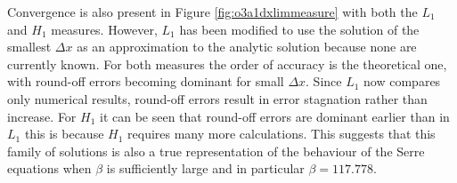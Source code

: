 \documentclass[SingleSpace,12pt,Proceedings]{Serre_ASCE}
\begin{document}
Convergence is also present in Figure \ref{fig:o3a1dxlimmeasure} with both the $L_1$ and $H_1$ measures. However, $L_1$ has been modified to use the solution of the smallest $\Delta x$ as an approximation to the analytic solution because none are currently known. For both measures the order of accuracy is the theoretical one, with round-off errors becoming dominant for small $\Delta x$. Since $L_1$ now compares only numerical results, round-off errors result in error stagnation rather than increase. For $H_1$ it can be seen that round-off errors are dominant earlier than in $L_1$ this is because $H_1$ requires many more calculations. This suggests that this family of solutions is also a true representation of the behaviour of the Serre equations when $\beta$ is sufficiently large and in particular $\beta = 117.778$. 
\end{document}

